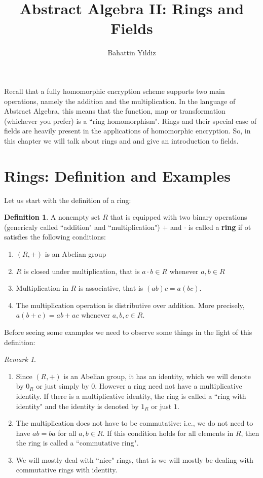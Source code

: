 \documentclass[12pt]{article}
\title{Abstract Algebra II: Rings and Fields}
\author{Bahattin Yildiz }
\date{}
\theoremstyle{plain}
\theoremstyle{definition}
\newtheorem{definition}{Definition}
\theoremstyle{remark}
\newtheorem{remark}{Remark}
\begin{document}
\maketitle

Recall that a fully homomorphic encryption scheme supports two main operations, namely the addition and the multiplication. In the language of Abstract Algebra, this means that the function, map or transformation (whichever you prefer) is a ``ring homomorphism". Rings and their special case of fields are heavily present in the applications of homomorphic encryption. So, in this chapter we will talk about rings and and give an introduction to fields.
\section{Rings: Definition and Examples}
Let us start with the definition of a ring:
\begin{definition}
A nonempty set $R$ that is equipped with two binary operations (genericaly called ``addition" and ``multiplication") $+$ and $\cdot$ is called a {\bf ring} if ot satisfies the following conditions:
\begin{enumerate}
    \item $(R,+)$ is an Abelian group
 \item $R$ is closed under multiplication, that is $a\cdot b \in R$ whenever $a,b\in R$
 \item Multiplication in $R$ is associative, that is $(ab)c=a(bc)$.
 \item The multiplication operation is distributive over addition. More precisely, $a(b+c)=ab+ac$ whenever $a, b, c \in R$.
\end{enumerate}
\end{definition}
Before seeing some examples we need to observe some things in the light of this definition:
\begin{remark}
\begin{enumerate}
    \item Since $(R,+)$ is an Abelian group, it has an identity, which we will denote by $0_R$ or just simply by $0$. However a ring need not have a multiplicative identity. If there is a multiplicative identity, the ring is called a ``ring with identity" and the identity is denoted by $1_R$ or just $1$.
    \item The multiplication does not have to be commutative: i.e., we do not need to have $ab=ba$ for all $a,b \in R$. If this condition holds for all elements in $R$, then the ring is called a ``commutative ring".
    \item We will mostly deal with ``nice" rings, that is we will mostly be dealing with commutative rings with identity.
\end{enumerate}
\end{remark}
\end{document}
